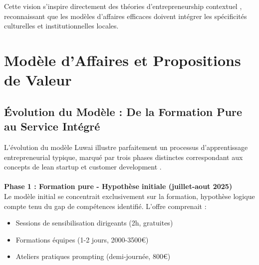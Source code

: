 Cette vision s'inspire directement des théories d'entrepreneurship contextuel \cite{welter2011contextualizing}, reconnaissant que les modèles d'affaires efficaces doivent intégrer les spécificités culturelles et institutionnelles locales.

\section{Modèle d'Affaires et Propositions de Valeur}

\subsection{Évolution du Modèle : De la Formation Pure au Service Intégré}

L'évolution du modèle Luwai illustre parfaitement un processus d'apprentissage entrepreneurial typique, marqué par trois phases distinctes correspondant aux concepts de lean startup et customer development \cite{blank2013startup,ries2011lean}.
\\\\
\textbf{Phase 1 : Formation pure - Hypothèse initiale (juillet-aout 2025)}\\
Le modèle initial se concentrait exclusivement sur la formation, hypothèse logique compte tenu du gap de compétences identifié. L'offre comprenait :
\begin{itemize}
    \item Sessions de sensibilisation dirigeants (2h, gratuites)
    \item Formations équipes (1-2 jours, 2000-3500€)
    \item Ateliers pratiques prompting (demi-journée, 800€)
\end{itemize}

